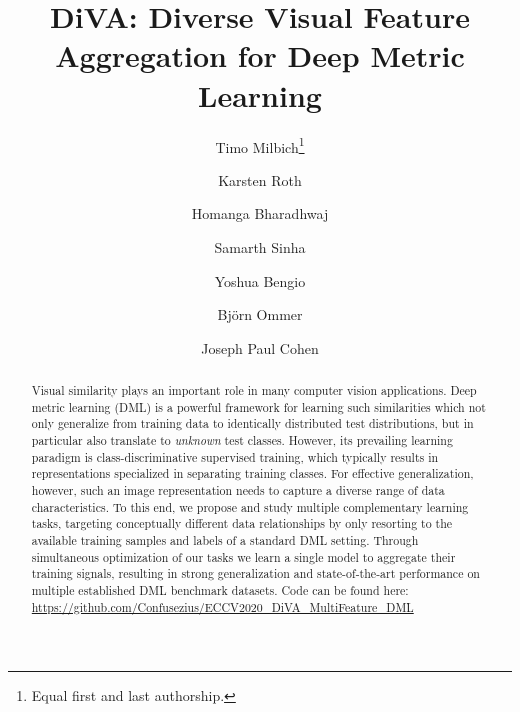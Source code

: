 \documentclass[runningheads]{llncs}
\begin{document}
\pagestyle{headings}
\mainmatter
\def\ECCVSubNumber{636}  


\title{DiVA: Diverse Visual Feature Aggregation for Deep Metric Learning} 

\begin{comment}
\titlerunning{636 \ECCVSubNumber} 
\authorrunning{636 \ECCVSubNumber} 
\author{Anonymous ECCV submission}
\institute{Paper ID \ECCVSubNumber}
\end{comment}


\author{Timo Milbich\thanks{Equal first and last authorship.} \and
Karsten Roth \and
Homanga Bharadhwaj \and
Samarth Sinha \and
Yoshua Bengio \and
Björn Ommer \and
Joseph Paul Cohen
}
\maketitle

\setcounter{footnote}{0}


\begin{abstract}
Visual similarity plays an important role in many computer vision applications. Deep metric learning (DML) is a powerful framework for learning such similarities which not only generalize from training data to identically distributed test distributions, but in particular also translate to \textit{unknown} test classes. However, its prevailing learning paradigm is class-discriminative supervised training, which typically results in representations specialized in separating training classes. For effective generalization, however, such an image representation needs to capture a diverse range of data characteristics. To this end, we propose and study multiple complementary learning tasks, targeting conceptually different data relationships by only resorting to the available training samples and labels of a standard DML setting. Through simultaneous optimization of our tasks we learn a single model to aggregate their training signals, resulting in strong generalization and state-of-the-art performance on multiple established DML benchmark datasets. Code can be found here: \url{https://github.com/Confusezius/ECCV2020_DiVA_MultiFeature_DML}
\end{abstract}
\end{document}
